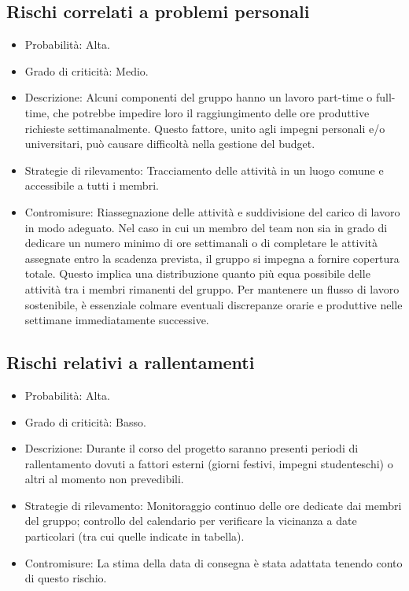 \subsection{Rischi correlati a problemi personali}
\begin{itemize}
  \item Probabilità: Alta.
  \item Grado di criticità: Medio.
  \item Descrizione: Alcuni componenti del gruppo hanno un lavoro part-time o full-time, che potrebbe impedire loro il raggiungimento delle ore produttive richieste settimanalmente. Questo fattore, unito agli impegni personali e/o universitari, può causare difficoltà nella gestione del budget.
  \item Strategie di rilevamento: Tracciamento delle attività in un luogo comune e accessibile a tutti i membri.
  \item Contromisure: Riassegnazione delle attività e suddivisione del carico di lavoro in modo adeguato. Nel caso in cui un membro del team non sia in grado di dedicare un numero minimo di ore settimanali o di completare le attività assegnate entro la scadenza prevista, il gruppo si impegna a fornire copertura totale. Questo implica una distribuzione quanto più equa possibile delle attività tra i membri rimanenti del gruppo. Per mantenere un flusso di lavoro sostenibile, è essenziale colmare eventuali discrepanze orarie e produttive nelle settimane immediatamente successive.
\end{itemize}

\subsection{Rischi relativi a rallentamenti}
\begin{itemize}
  \item Probabilità: Alta.
  \item Grado di criticità: Basso.
  \item Descrizione: Durante il corso del progetto saranno presenti periodi di rallentamento dovuti a fattori esterni (giorni festivi, impegni studenteschi) o altri al momento non prevedibili.
  \item Strategie di rilevamento: Monitoraggio continuo delle ore dedicate dai membri del gruppo; controllo del calendario per verificare la vicinanza a date particolari (tra cui quelle indicate in tabella).
  \item Contromisure: La stima della data di consegna è stata adattata tenendo conto di questo rischio.
\end{itemize}

